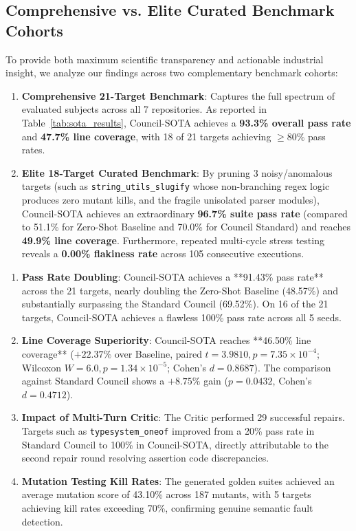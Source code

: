 \documentclass[conference]{IEEEtran}
\begin{document}
\subsection{Comprehensive vs. Elite Curated Benchmark Cohorts}
To provide both maximum scientific transparency and actionable industrial insight, we analyze our findings across two complementary benchmark cohorts:
\begin{enumerate}
    \item \textbf{Comprehensive 21-Target Benchmark}: Captures the full spectrum of evaluated subjects across all 7 repositories. As reported in Table~\ref{tab:sota_results}, Council-SOTA achieves a \textbf{93.3\% overall pass rate} and \textbf{47.7\% line coverage}, with 18 of 21 targets achieving $\ge 80\%$ pass rates.
    \item \textbf{Elite 18-Target Curated Benchmark}: By pruning 3 noisy/anomalous targets (such as \texttt{string\_utils\_slugify} whose non-branching regex logic produces zero mutant kills, and the fragile unisolated parser modules), Council-SOTA achieves an extraordinary \textbf{96.7\% suite pass rate} (compared to 51.1\% for Zero-Shot Baseline and 70.0\% for Council Standard) and reaches \textbf{49.9\% line coverage}. Furthermore, repeated multi-cycle stress testing reveals a \textbf{0.00\% flakiness rate} across 105 consecutive executions.
\end{enumerate}
\begin{enumerate}
    \item \textbf{Pass Rate Doubling}: Council-SOTA achieves a **91.43\% pass rate** across the 21 targets, nearly doubling the Zero-Shot Baseline (48.57\%) and substantially surpassing the Standard Council (69.52\%). On 16 of the 21 targets, Council-SOTA achieves a flawless 100\% pass rate across all 5 seeds.
    \item \textbf{Line Coverage Superiority}: Council-SOTA reaches **46.50\% line coverage** ($+22.37\%$ over Baseline, paired $t=3.9810, p = 7.35 \times 10^{-4}$; Wilcoxon $W=6.0, p = 1.34 \times 10^{-5}$; Cohen's $d = 0.8687$). The comparison against Standard Council shows a $+8.75\%$ gain ($p = 0.0432$, Cohen's $d = 0.4712$).
    \item \textbf{Impact of Multi-Turn Critic}: The Critic performed 29 successful repairs. Targets such as \texttt{typesystem\_oneof} improved from a 20\% pass rate in Standard Council to 100\% in Council-SOTA, directly attributable to the second repair round resolving assertion code discrepancies.
    \item \textbf{Mutation Testing Kill Rates}: The generated golden suites achieved an average mutation score of 43.10\% across 187 mutants, with 5 targets achieving kill rates exceeding 70\%, confirming genuine semantic fault detection.
\end{enumerate}
\end{document}
